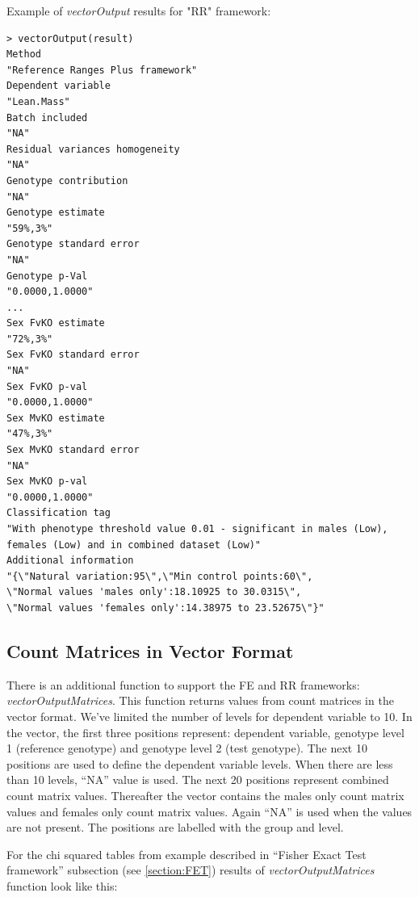 \documentclass[12pt,a4paper]{article}
\begin{document}
Example of \textit{vectorOutput} results for "RR" framework:
\begingroup
\fontsize{8pt}{12pt}\selectfont
\begin{verbatim}
> vectorOutput(result)
Method 
"Reference Ranges Plus framework" 
Dependent variable 
"Lean.Mass" 
Batch included 
"NA" 
Residual variances homogeneity 
"NA" 
Genotype contribution 
"NA" 
Genotype estimate 
"59%,3%" 
Genotype standard error 
"NA" 
Genotype p-Val 
"0.0000,1.0000" 
... 
Sex FvKO estimate 
"72%,3%" 
Sex FvKO standard error 
"NA" 
Sex FvKO p-val 
"0.0000,1.0000" 
Sex MvKO estimate 
"47%,3%" 
Sex MvKO standard error 
"NA" 
Sex MvKO p-val 
"0.0000,1.0000" 
Classification tag 
"With phenotype threshold value 0.01 - significant in males (Low), females (Low) and in combined dataset (Low)" 
Additional information 
"{\"Natural variation:95\",\"Min control points:60\",
\"Normal values 'males only':18.10925 to 30.0315\",
\"Normal values 'females only':14.38975 to 23.52675\"}" 
\end{verbatim}
\endgroup

\subsection{Count Matrices in Vector Format}
There is an additional function to support the FE and RR frameworks: \textit{vectorOutputMatrices}. This function returns values from count matrices in the vector format.
We've limited the number of levels for dependent variable to 10. 
In the vector, the first three positions represent: dependent variable, genotype level 1 (reference genotype) and genotype level 2 (test genotype).
The next 10 positions are used to define the dependent variable levels. When there are less than 10 levels, ``NA'' value is used.
The next 20 positions represent combined count matrix values. Thereafter the vector contains the males only count matrix values and females only count matrix values. Again ``NA'' is used when the values are not present. The positions are labelled with the group and level.

For the chi squared tables from example described in ``Fisher Exact Test framework'' subsection (see \ref{section:FET}) results of \textit{vectorOutputMatrices} function look like this:
\end{document}
